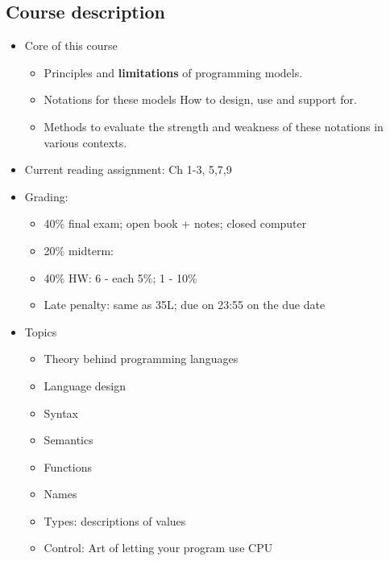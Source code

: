 \documentclass[11pt]{article}
\begin{document}
\subsection{Course description}
\label{sec:org2cae0e3}
\begin{itemize}
\item Core of this course
\begin{itemize}
\item Principles and \textbf{limitations} of programming models.

\item Notations for these models
How to design, use and support for.

\item Methods to evaluate the strength and weakness of these notations in
various contexts.
\end{itemize}

\item Current reading assignment: Ch 1-3, 5,7,9

\item Grading:
\begin{itemize}
\item 40\% final exam; open book + notes; closed computer

\item 20\% midterm:

\item 40\% HW: 6 - each 5\%; 1 - 10\%

\item Late penalty: same as 35L; due on 23:55 on the due date
\end{itemize}

\item Topics
\begin{itemize}
\item Theory behind programming languages

\item Language design

\item Syntax

\item Semantics

\item Functions

\item Names

\item Types: descriptions of values

\item Control: Art of letting your program use CPU


\end{itemize}
\end{itemize}
\end{document}
